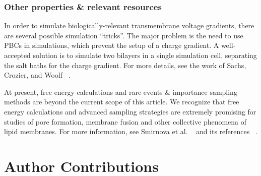 \documentclass[9pt,bestpractices,pubversion]{livecoms}
\begin{document}
\subsubsection{Other properties \& relevant resources}
\label{subsubsec:otherprops}
In order to simulate biologically-relevant transmembrane voltage gradients, there are several possible simulation ``tricks''.
The major problem is the need to use PBCs in simulations, which prevent the setup of a charge gradient.
A well-accepted solution is to simulate two bilayers in a single simulation cell, separating the salt baths for the charge gradient.
For more details, see the work of Sachs, Crozier, and Woolf ~\cite{Sachs2004}.

At present, free energy calculations and rare events \& importance sampling methods are beyond the current scope of this article.
We recognize that free energy calculations and advanced sampling strategies are extremely promising for studies of pore formation, membrane fusion and other collective phenomena of lipid membranes.
For more information, see Smirnova et al. ~\cite{Smirnova2015} and its references ~\cite{Venable2015,Marrink2004}.

%
%


\section{Author Contributions}
%
\end{document}
